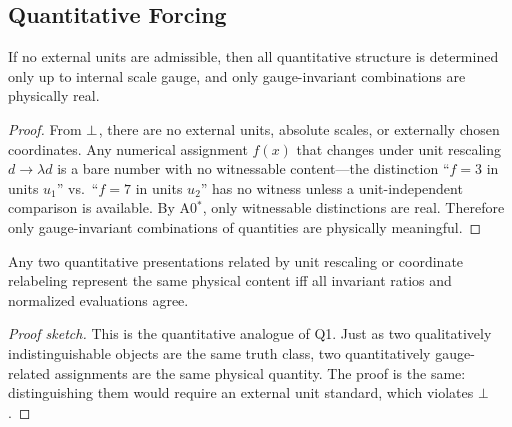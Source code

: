 \subsection{Quantitative Forcing}
\label{sec:forcing:quantitative}

\begin{theorem}
\label{thm:quantitative-forcing}
If no external units are admissible, then all quantitative structure is
determined only up to internal scale gauge, and only gauge-invariant
combinations are physically real.
\begin{proof}[Proof]
From $\bot$, there are no external units, absolute scales, or externally
chosen coordinates.  Any numerical assignment $f(x)$ that changes under
unit rescaling $d \to \lambda d$ is a bare number with no witnessable
content---the distinction ``$f = 3$ in units $u_1$'' vs.\ ``$f = 7$ in
units $u_2$'' has no witness unless a unit-independent comparison is
available.  By A0$^*$, only witnessable distinctions are real.  Therefore
only gauge-invariant combinations of quantities are physically meaningful.
\end{proof}
\end{theorem}

\begin{theorem}
\label{thm:gauge-of-units}
Any two quantitative presentations related by unit rescaling or coordinate
relabeling represent the same physical content iff all invariant ratios
and normalized evaluations agree.
\begin{proof}[Proof sketch]
This is the quantitative analogue of Q1.  Just as two qualitatively
indistinguishable objects are the same truth class, two quantitatively
gauge-related assignments are the same physical quantity.  The proof is
the same: distinguishing them would require an external unit standard,
which violates $\bot$.
\end{proof}
\end{theorem}

